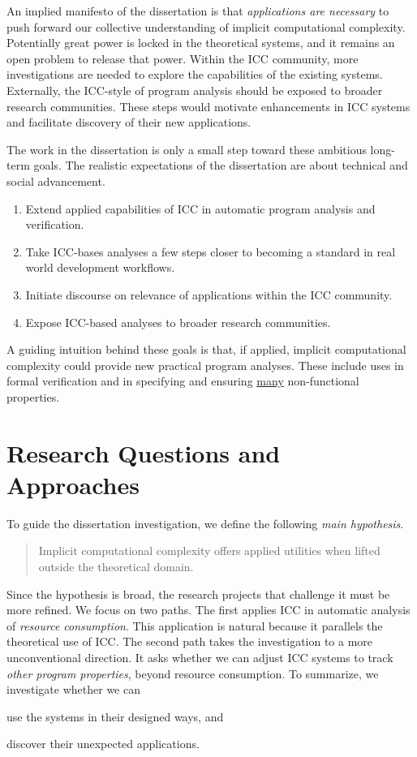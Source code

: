 An implied manifesto of the dissertation is that \emph{applications are necessary} to push forward our collective understanding of implicit computational complexity.
Potentially great power is locked in the theoretical systems, and it remains an open problem to release that power.
Within the ICC community, more investigations are needed to explore the capabilities of the existing systems.
Externally, the ICC-style of program analysis should be exposed to broader research communities.
These steps would motivate enhancements in ICC systems and facilitate discovery of their new applications.

The work in the dissertation is only a small step toward these ambitious long-term goals.
The realistic expectations of the dissertation are about technical and social advancement.
\begin{enumerate}
\item Extend {applied} capabilities of ICC in automatic program analysis and verification.
\item Take ICC-bases analyses a few steps closer to becoming a standard in real world development workflows.
\item Initiate discourse on relevance of applications within the ICC community.
\item Expose ICC-based analyses to broader research communities.
\end{enumerate}
A guiding intuition behind these goals is that, {if applied}, implicit computational complexity could provide new practical program analyses.
These include uses in formal verification and in specifying and ensuring \uline{many} non-functional properties.

\section{Research Questions and Approaches}
\label{aicc-approaches}

To guide the dissertation investigation, we define the following \emph{main hypothesis}.
\begin{quote}
\noindent Implicit computational complexity offers applied utilities when lifted outside the theoretical domain.
\end{quote}
Since the hypothesis is broad, the research projects that challenge it must be more refined.
We focus on two paths.
The first applies ICC in automatic analysis of \emph{resource consumption}.
This application is natural because it parallels the theoretical use of ICC.
The second path takes the investigation to a more unconventional direction.
It asks whether we can adjust ICC systems to track \emph{other program properties}, beyond resource consumption.
To summarize, we investigate whether we can
\begin{enumerate*}[label=(\roman*)]
\item use the systems in their designed ways, and
\item discover their unexpected applications.
\end{enumerate*}


